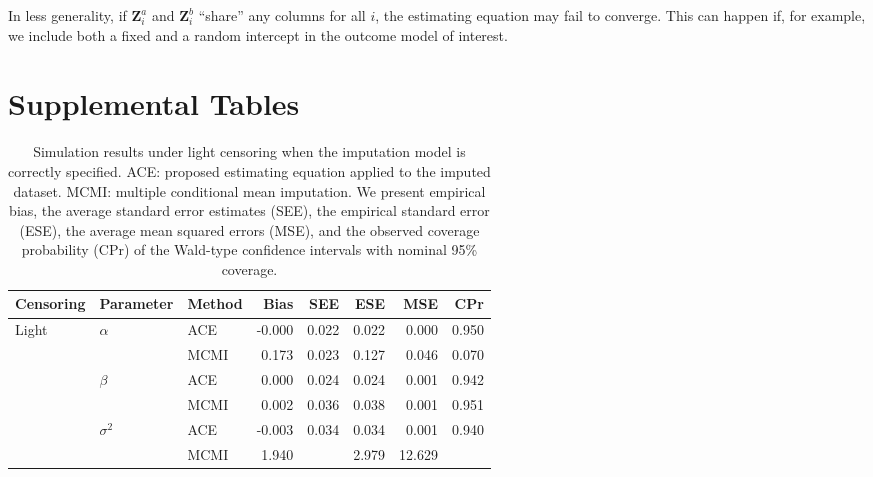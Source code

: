 \documentclass[12pt]{article}
\def\bZ{{\boldsymbol Z}}
\begin{document}
In less generality, if $\bZ^a_i$ and $\bZ^b_i$ ``share'' any columns for all $i$, the estimating equation may fail to converge. This can happen if, for example, we include both a fixed and a random intercept in the outcome model of interest.

\section{Supplemental Tables}
\label{sec:app_tables}

\begin{table}[hbt!]
\centering
\begin{tabular}{lllrrrrr}
  \hline
Censoring & Parameter & Method & Bias & SEE & ESE & MSE & CPr \\ 
  \hline
Light & $\alpha$ & ACE & -0.000 & 0.022 & 0.022 & 0.000 & 0.950 \\ 
  &  & MCMI & 0.173 & 0.023 & 0.127 & 0.046 & 0.070 \\ 
  & $\beta$ & ACE & 0.000 & 0.024 & 0.024 & 0.001 & 0.942 \\ 
  &  & MCMI & 0.002 & 0.036 & 0.038 & 0.001 & 0.951 \\ 
  & $\sigma^2$ & ACE & -0.003 & 0.034 & 0.034 & 0.001 & 0.940 \\ 
  &  & MCMI & 1.940 &  & 2.979 & 12.629 &  \\
   \hline
\end{tabular}
\caption{Simulation results under light censoring when the imputation model is correctly specified. ACE: proposed estimating equation applied to the imputed dataset. MCMI: multiple conditional mean imputation. We present empirical bias, the average standard error estimates (SEE), the empirical standard error (ESE), the average mean squared errors (MSE), and the observed coverage probability (CPr) of the Wald-type confidence intervals with nominal 95\% coverage.}
\label{table:corr_spec_results_light}
\end{table}
\end{document}
